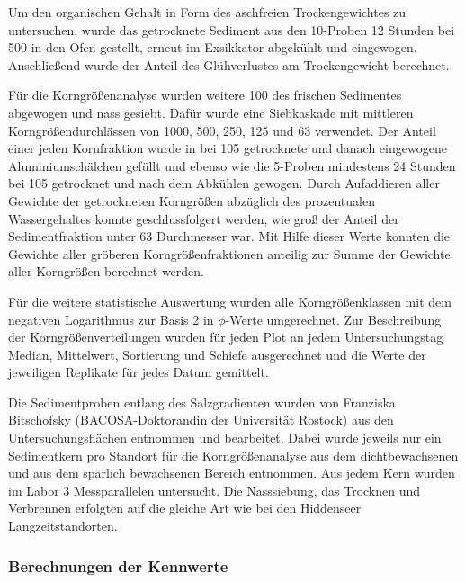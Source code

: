 Um den organischen Gehalt in Form des aschfreien Trockengewichtes zu untersuchen, wurde das getrocknete Sediment aus den \unit{10}{\milli\litre}-Proben 12 Stunden bei \unit{500}{\celsius} in den Ofen gestellt, erneut im Exsikkator abgekühlt und eingewogen. Anschließend wurde der Anteil des Glühverlustes am Trockengewicht berechnet.

Für die Korngrößenanalyse wurden weitere \unit{100}{\gram} des frischen Sedimentes abgewogen und nass gesiebt. Dafür wurde eine Siebkaskade mit mittleren Korngrößendurchlässen von \unit{1000}{\micro\metre}, \unit{500}{\micro\metre}, \unit{250}{\micro\metre}, \unit{125}{\micro\metre} und \unit{63}{\micro\metre} verwendet. Der Anteil einer jeden Kornfraktion wurde in bei \unit{105}{\celsius} getrocknete  und danach eingewogene Aluminiumschälchen gefüllt und ebenso wie die \unit{5}{\milli\litre}-Proben mindestens 24 Stunden bei \unit{105}{\celsius} getrocknet und nach dem Abkühlen gewogen. Durch Aufaddieren aller Gewichte der getrockneten Korngrößen abzüglich des prozentualen Wassergehaltes konnte geschlussfolgert werden, wie groß der Anteil der Sedimentfraktion unter \unit{63}{\micro\metre} Durchmesser war. Mit Hilfe dieser Werte konnten die Gewichte aller gröberen Korngrößenfraktionen anteilig zur Summe der Gewichte aller Korngrößen berechnet werden.

Für die weitere statistische Auswertung wurden alle Korngrößenklassen mit dem negativen Logarithmus zur Basis 2 in $ \phi $-Werte umgerechnet. 
Zur Beschreibung der Korngrößenverteilungen wurden für jeden Plot an jedem Untersuchungstag Median, Mittelwert, Sortierung und Schiefe ausgerechnet und die Werte der jeweiligen Replikate für jedes Datum gemittelt.

Die Sedimentproben entlang des Salzgradienten wurden von Franziska Bitschofsky (BACOSA-Doktorandin der Universität Rostock) aus den Untersuchungsflächen entnommen und bearbeitet. Dabei wurde jeweils nur ein Sedimentkern pro Standort für die Korngrößenanalyse aus dem dichtbewachsenen und aus dem spärlich bewachsenen Bereich entnommen. Aus jedem Kern wurden im Labor 3 Messparallelen untersucht. Die Nasssiebung, das Trocknen und Verbrennen erfolgten auf die gleiche Art wie bei den Hiddenseer Langzeitstandorten.


 
\subsubsection{Berechnungen der Kennwerte}


